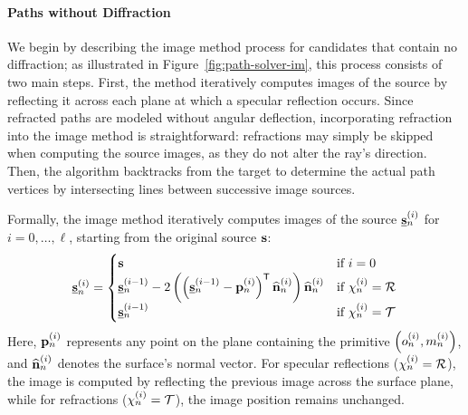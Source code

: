 \paragraph{Paths without Diffraction}
We begin by describing the image method process for candidates that contain no diffraction; as illustrated in Figure~\ref{fig:path-solver-im}, this process consists of two main steps. First, the method iteratively computes images of the source by reflecting it across each plane at which a specular reflection occurs.
Since refracted paths are modeled without angular deflection, incorporating refraction into the image method is straightforward: refractions may simply be skipped when computing the source images, as they do not alter the ray's direction.
Then, the algorithm backtracks from the target to determine the actual path vertices by intersecting lines between successive image sources.

Formally, the image method iteratively computes images of the source $\underline{\mathbf{s}}_n^{(i)}$ for $i = 0, \dots, \ell$, starting from the original source $\mathbf{s}$:
\begin{equation}
    \underline{\mathbf{s}}_n^{(i)} = \begin{cases}
        \mathbf{s} & \text{if } i = 0\\
        \underline{\mathbf{s}}_n^{(i-1)} - 2\left( \left(\underline{\mathbf{s}}_n^{(i-1)} - \mathbf{p}_n^{(i)}\right)^{\mathsf{T}} \widehat{\mathbf{n}}_n^{(i)}\right) \widehat{\mathbf{n}}_n^{(i)}& \text{if } \chi_n^{(i)} = {\cal R}\\
        \underline{\mathbf{s}}_n^{(i-1)} & \text{if } \chi_n^{(i)} = {\cal T}
    \end{cases}
\end{equation}
Here, $\mathbf{p}_n^{(i)}$ represents any point on the plane containing the primitive $\left( o_n^{(i)}, m_n^{(i)} \right)$, and $\widehat{\mathbf{n}}_n^{(i)}$ denotes the surface's normal vector. For specular reflections ($\chi_n^{(i)} = {\cal R}$), the image is computed by reflecting the previous image across the surface plane, while for refractions ($\chi_n^{(i)} = {\cal T}$), the image position remains unchanged.

